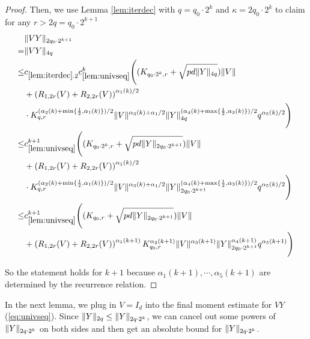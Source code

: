 \documentclass[11pt]{amsart}
\numberwithin{equation}{section}
\numberwithin{equation}{section}
\DeclarePairedDelimiter{\norm}{\lVert}{\rVert}
\begin{document}
\begin{proof}
    Then, we use Lemma \ref{lem:iterdec} with $q=q_0 \cdot 2^k$ and $\kappa=2q_0\cdot 2^{k}$ to claim for any $r>2q=q_0 \cdot 2^{k+1}$
    \begin{align*}
    &\norm{VY}_{2q_0\cdot 2^{k+1}}\\=&\norm{VY}_{4q} \\\le& c_{\ref{lem:iterdec}.2}c_{\ref{lem:univseq}}^k \Bigg((K_{q_0 \cdot 2^k,r}+\sqrt{pd\norm{Y}_{4q}})\norm{V} \\&+ \left(R_{1,2r}(V)+R_{2,2r}(V)\right)^{\alpha_1(k)/2} \\& \cdot K_{q,r}^{(\alpha_2(k)+\min\{\frac{1}{2},\alpha_1(k)\})/2}\norm{V}^{\alpha_3(k)+\alpha_1/2} \norm{Y}_{4q}^{(\alpha_4(k)+\max\{\frac{1}{2},\alpha_3(k)\})/2}q^{\alpha_5(k)/2}\Bigg)
    \\ \le & c_{\ref{lem:univseq}}^{k+1} \Bigg((K_{q_0 \cdot 2^k,r}+\sqrt{pd\norm{Y}_{2q_0\cdot 2^{k+1}}})\norm{V} \\&+ \left(R_{1,2r}(V)+R_{2,2r}(V)\right)^{\alpha_1(k)/2} \\& \cdot K_{q,r}^{(\alpha_2(k)+\min\{\frac{1}{2},\alpha_1(k)\})/2}\norm{V}^{\alpha_3(k)+\alpha_1/2} \norm{Y}_{2q_0\cdot 2^{k+1}}^{(\alpha_4(k)+\max\{\frac{1}{2},\alpha_3(k)\})/2}q^{\alpha_5(k)/2}\Bigg)
    \\ \le & c_{\ref{lem:univseq}}^{k+1} \Bigg((K_{q_0,r}+\sqrt{pd\norm{Y}_{2q_0\cdot 2^{k+1}}})\norm{V} \\&+ \left(R_{1,2r}(V)+R_{2,2r}(V)\right)^{\alpha_1(k+1)}K_{q_0,r}^{\alpha_2(k+1)}\norm{V}^{\alpha_3(k+1)} \norm{Y}_{2q_0 \cdot 2^{k+1}}^{\alpha_4(k+1)}q^{\alpha_5(k+1)}\Bigg)
\end{align*}

    So the statement holds for $k+1$ because $\alpha_1(k+1), \cdots ,\alpha_5(k+1)$ are determined by the recurrence relation.
\end{proof}


In the next lemma, we plug in $V=I_d$ into the final moment estimate for $VY$ (\ref{eq:univseq}). Since $\norm{Y}_{2q} \le \norm{Y}_{2q \cdot 2^k}$, we can cancel out some powers of $\norm{Y}_{2q \cdot 2^k}$ on both sides and then get an absolute bound for $\norm{Y}_{2q \cdot 2^k}$.
\end{document}
